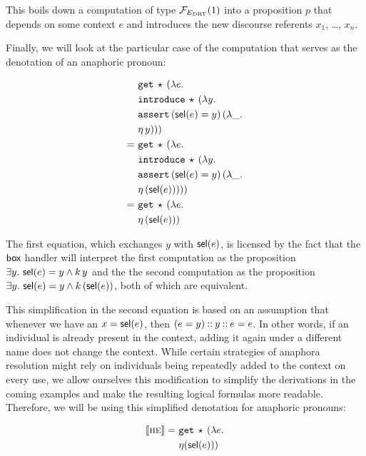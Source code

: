 This boils down a computation of type $\mathcal{F}_{E_{\mathrm{DRT}}}(1)$ into a proposition
$p$ that depends on some context $e$ and introduces the new discourse
referents $x_1$, \ldots, $x_n$.

Finally, we will look at the particular case of the computation that serves
as the denotation of an anaphoric pronoun:

\begin{align*}
   &\mathtt{get}\,\star\,(\lambda e.\,  \\
   &\mathtt{introduce}\,\star\,(\lambda y.\,  \\
   &\mathtt{assert}\,(\textsf{sel}(e) = y)\,(\lambda \_.\,  \\
   &\eta\,y))) \\
=\ &\mathtt{get}\,\star\,(\lambda e.\,  \\
   &\mathtt{introduce}\,\star\,(\lambda y.\,  \\
   &\mathtt{assert}\,(\textsf{sel}(e) = y)\,(\lambda \_.\,  \\
   &\eta\,(\textsf{sel}(e))))) \\
=\ &\mathtt{get}\,\star\,(\lambda e.\,  \\
   &\eta\,(\textsf{sel}(e)))
\end{align*}

The first equation, which exchanges $y$ with $\textsf{sel}(e)$, is licensed by the
fact that the $\textsf{box}$ handler will interpret the first computation as the
proposition $\exists y.\ \textsf{sel}(e) = y \land k\,y$ and the the second
computation as the proposition
$\exists y.\ \textsf{sel}(e) = y \land k\,(\textsf{sel}(e))$, both of which are
equivalent.

This simplification in the second equation is based on an assumption that
whenever we have an $x = \textsf{sel}(e)$, then $(e = y) \mathbin{::} y \mathbin{::} e = e$. In
other words, if an individual is already present in the context, adding it
again under a different name does not change the context. While certain
strategies of anaphora resolution might rely on individuals being
repeatedly added to the context on every use, we allow ourselves this
modification to simplify the derivations in the coming examples and make
the resulting logical formulas more readable. Therefore, we will be using
this simplified denotation for anaphoric pronouns:

\begin{align*}
  \llbracket \textsc{he} \rrbracket =\ &\mathtt{get}\,\star\,(\lambda e.\,  \\
                    &\eta{(\textsf{sel}(e))})
\end{align*}


